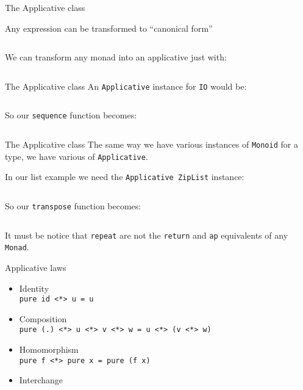 \documentclass[10pt]{beamer}
\begin{document}
\begin{frame}{The Applicative class}

  Any expression can be transformed to ``canonical form''

  \inputminted{text}{./src/canonical.txt}

  We can transform any monad into an applicative just with:

  \inputminted{haskell}{./src/to_monad.hs}
\end{frame}

\begin{frame}{The Applicative class}
  An \verb~Applicative~ instance for \verb~IO~ would be:

  \inputminted{haskell}{./src/io_instance.hs}

  So our \verb~sequence~ function becomes:

  \inputminted{haskell}{./src/sequence_ap.hs}
\end{frame}

\begin{frame}{The Applicative class}
  The same way we have various instances of \verb~Monoid~ for a type,
  we have various of \verb~Applicative~.

  In our list example we need the \verb~Applicative ZipList~ instance:

  \inputminted{haskell}{./src/ListInstance.hs}

  So our \verb~transpose~ function becomes:

  \inputminted{haskell}{./src/transpose_ap.hs}

  It must be notice that \verb~repeat~ are not the \verb~return~ and
  \verb~ap~ equivalents of any \verb~Monad~.

\end{frame}

\begin{frame}{Applicative laws}
  \begin{itemize}
  \item Identity\\
    \verb~pure id <*> u = u~
  \item Composition\\
    \verb~pure (.) <*> u <*> v <*> w = u <*> (v <*> w)~
  \item Homomorphism\\
    \verb~pure f <*> pure x = pure (f x)~
  \item Interchange
  \end{itemize}
\end{frame}
\end{document}
